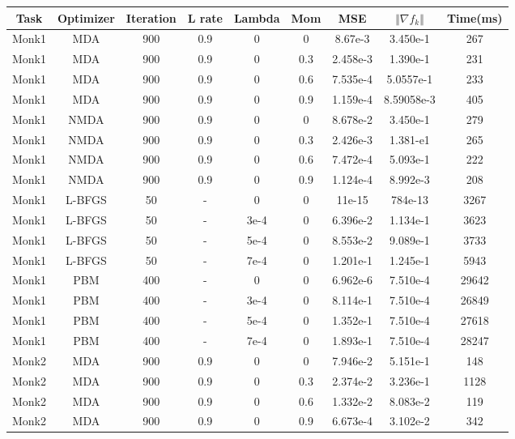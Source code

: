 \begin{center}
	\small\addtolength{\tabcolsep}{-3pt}
		\centering
		\begin{longtable}{|c|c|c|c|c|c|c|c|c|}
			\hline
			\textbf{Task}& \textbf{Optimizer}&\textbf{Iteration} & \textbf{L rate} & \multicolumn{1}{l|}{\textbf{Lambda}} & \textbf{Mom} & \textbf{MSE}& \textbf{$\Vert \nabla f_{k}\Vert$ }& \textbf{Time(ms)}\\ \hline 
			Monk1 & MDA & 900 & 0.9 & 0  & 0 & 8.67e-3 & 3.450e-1 & 267 \\
			Monk1 & MDA & 900 & 0.9 & 0  & 0.3 & 2.458e-3 & 1.390e-1 & 231 \\
			Monk1 & MDA & 900 & 0.9 & 0  & 0.6 & 7.535e-4 & 5.0557e-1 & 233 \\
			Monk1 & MDA & 900 & 0.9 & 0  & 0.9 & 1.159e-4 & 8.59058e-3 & 405 \\
			Monk1 & NMDA & 900 & 0.9 & 0  & 0 & 8.678e-2 & 3.450e-1 & 279 \\
			Monk1 & NMDA & 900 & 0.9 & 0  & 0.3 & 2.426e-3 & 1.381-e1 & 265 \\
			Monk1 & NMDA & 900 & 0.9 & 0  & 0.6 & 7.472e-4 & 5.093e-1 & 222 \\
			Monk1 & NMDA & 900 & 0.9 & 0  & 0.9 & 1.124e-4 & 8.992e-3 & 208 \\
			Monk1 & L-BFGS & 50 & - & 0  & 0 & 11e-15 & 784e-13 & 3267 \\
			Monk1 & L-BFGS & 50 & - & 3e-4  & 0 & 6.396e-2 & 1.134e-1 & 3623 \\
			Monk1 & L-BFGS & 50 & - & 5e-4  & 0 & 8.553e-2 & 9.089e-1 & 3733 \\
			Monk1 & L-BFGS & 50 & - & 7e-4  & 0 & 1.201e-1 & 1.245e-1 & 5943 \\
			Monk1 & PBM & 400 & - & 0  & 0 & 6.962e-6 & 7.510e-4 & 29642 \\
			Monk1 & PBM & 400 & - & 3e-4  & 0 & 8.114e-1 & 7.510e-4 & 26849 \\
			Monk1 & PBM & 400 & - & 5e-4  & 0 & 1.352e-1 & 7.510e-4 & 27618 \\
			Monk1 & PBM & 400 & - & 7e-4  & 0 & 1.893e-1 & 7.510e-4 & 28247 \\
			Monk2 & MDA & 900 & 0.9 & 0  & 0 & 7.946e-2 & 5.151e-1 & 148\\
			Monk2 & MDA & 900 & 0.9 & 0  & 0.3 & 2.374e-2 & 3.236e-1 & 1128 \\
			Monk2 & MDA & 900 & 0.9 & 0  & 0.6 & 1.332e-2 & 8.083e-2 & 119 \\
			Monk2 & MDA & 900 & 0.9 & 0  & 0.9 & 6.673e-4 & 3.102e-2 & 342\\

\end{longtable}
\end{center}
